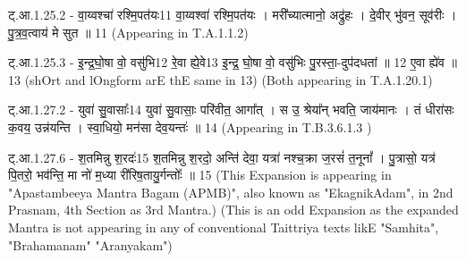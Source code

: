 \documentclass[17pt]{extarticle}
\begin{document}
ट्.आ.1.25.2 - वा॒य्वश्चा॑ रश्मि॒पत॑यः{11} 
वा॒य्वश्वा॑ रश्मि॒पत॑यः । मरी᳚च्यात्मानो॒ अद्रु॑हः । दे॒वीर् भु॑वन॒ सूव॑रीः । 
पु॒त्र॒व॒त्वाय॑ मे सुत ॥ {11} 
(Appearing in T.A.1.1.2)


ट्.आ.1.25.3 - इ॒न्द्र॒घो॒षा वो॒ वसु॑भि{12} रे॒वा ह्ये॒वे{13} इ॒न्द्र॒ घो॒षा वो॒ वसु॑भिः पु॒रस्ता॒-दुप॑दधतां ॥ {12}
ए॒वा ह्ये॑व ॥ {13} 
(shOrt and lOngform arE thE same in {13}) (Both appearing in T.A.1.20.1)

ट्.आ.1.27.2 - युवा॑ सु॒वासाः᳚{14} 
युवा॑ सु॒वासाः॒ परि॑वीत॒ आगा᳚त् । स उ॒ श्रेया᳚न् भवति॒ जाय॑मानः ।
तं धीरा॑सः क॒वय॒ उन्न॑यन्ति । स्वा॒धियो॒ मन॑सा देव॒यन्तः॑ ॥ {14}
(Appearing in T.B.3.6.1.3 )

ट्.आ.1.27.6 - श॒तमिन्नु श॒रदः॑{15} 
श॒तमिन्नु श॒रदो॒ अन्ति॑ देवा॒ यत्रा॑ नश्च॒क्रा ज॒रसं॑ त॒नूनां᳚ । पु॒त्रासो॒ यत्र॑ पि॒तरो॒ भव॑न्ति॒ मा नो॑ म॒ध्या री॑रिष॒तायु॒र्गन्तोः᳚ ॥ {15}
(This Expansion is appearing in "Apastambeeya Mantra Bagam (APMB)", also known as "EkagnikAdam", in 2nd Prasnam, 4th Section as 3rd Mantra.) 
(This is an odd Expansion as the expanded Mantra is not appearing in any of conventional Taittriya texts likE "Samhita", "Brahamanam" "Aranyakam") \newline
\pagebreak
\pagebreak
        
\end{document}
